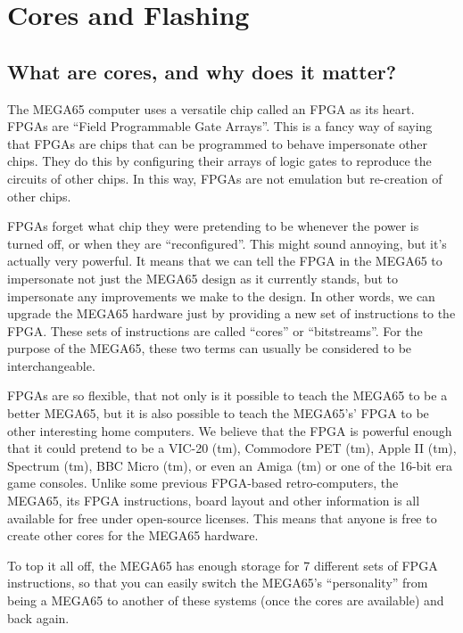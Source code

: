 \chapter{Cores and Flashing}
\label{cha:cores}

\section{What are cores, and why does it matter?}

The MEGA65 computer uses a versatile chip called an FPGA as its heart.
FPGAs are ``Field Programmable Gate Arrays''. This is a fancy way of
saying that FPGAs are chips that can be programmed to behave impersonate
other chips.  They do this by configuring their arrays of logic gates to
reproduce the circuits of other chips. In this way, FPGAs are not emulation
but re-creation of other chips.

FPGAs forget what chip they were pretending
to be whenever the power is turned off, or when they are ``reconfigured''.
This might sound annoying, but it's actually very powerful. It means that
we can tell the FPGA in the MEGA65 to impersonate not just the MEGA65 design
as it currently stands, but to impersonate any improvements we make to the design.
In other words, we can upgrade the MEGA65 hardware just by providing a new
set of instructions to the FPGA.  These sets of instructions are called ``cores''
or ``bitstreams''.  For the purpose of the MEGA65, these two terms can usually be
considered to be interchangeable.

FPGAs are so flexible, that not only is it possible to teach the MEGA65 to be a better
MEGA65, but it is also possible to teach the MEGA65's' FPGA to be other interesting
home computers.  We believe that the FPGA is powerful enough that it could pretend to be
a VIC-20 (tm), Commodore PET (tm), Apple II (tm), Spectrum (tm), BBC Micro (tm), or even
an Amiga (tm) or one of the 16-bit era game consoles.  Unlike some previous FPGA-based
retro-computers, the MEGA65, its FPGA instructions, board layout and other information is
all available for free under open-source licenses. This means that anyone is free to
create other cores for the MEGA65 hardware.

To top it all off, the MEGA65 has enough storage for 7 different sets of FPGA instructions,
so that you can easily switch the MEGA65's ``personality'' from being a MEGA65 to another
of these systems (once the cores are available) and back again.


